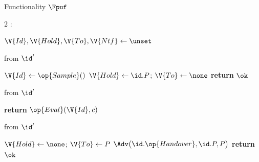 \begin{interface}[nofloat]{Functionality $\Fpuf$ \\
}

{\scriptsize
\setlength{\columnsep}{1.4em}
\begin{multicols}{2}
:
\begin{algorithmic}[1]
\setcounter{contline}{0}\algcont
\State $\V{Id}, \V{Hold}, \V{To}, \V{Ntf} \gets \unset$
\algsave
\end{algorithmic}
\vspace{1.4ex}

 \quad from $\id'$
\begin{algorithmic}[1]
\algcont
{} \label{ln:pufonce}
\State $\V{Id} \gets \op{Sample}()$
\State $\V{Hold} \gets \id.P$; \quad $\V{To} \gets \none$
\State \textbf{return} $\ok$
\algsave
\end{algorithmic}
\vspace{1.4ex}

 \quad from $\id'$
\begin{algorithmic}[1]
\algcont
{}
 \label{ln:pufintransit}
\EndIf
{}
 \label{ln:pufholder}
\EndIf
\State \textbf{return} $\op{Eval}(\V{Id}, c)$ \label{ln:pufeval}
\algsave
\end{algorithmic}
\vspace{1.4ex}

\columnbreak

 \quad from $\id'$
\begin{algorithmic}[1]
\algcont
{}
\State $\V{Hold} \gets \none$; \quad $\V{To} \gets P$ \label{ln:pufleave}
\State $\Adv\bigl(\id.\op{Handover}, \id.P, P\bigr)$
\State \textbf{return} $\ok$
\algsave
\end{algorithmic}
\vspace{1.4ex}


\end{multicols}}
\end{interface}
